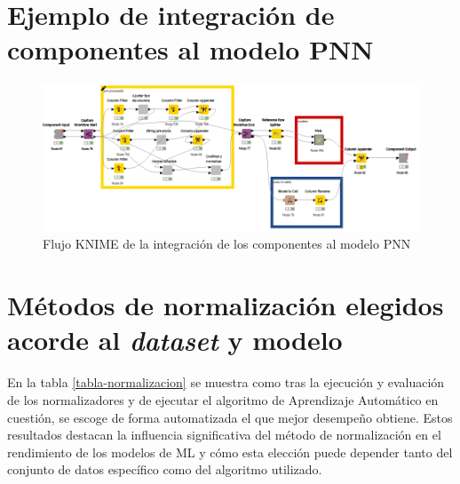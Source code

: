 \chapter{Ejemplo de integración de componentes al modelo PNN} \label{aped:14}

\begin{figure}[H]
	\centering
	\includegraphics[width=\textwidth]{"figuras/anexos/ejemplo integracion componentes pnn"}
	\caption{Flujo KNIME de la integración de los componentes al modelo PNN}
	\label{fig:ejemplo-integracion-componentes-pnn}
\end{figure}


\chapter{Métodos de normalización elegidos acorde al \textit{dataset} y modelo} \label{aped:15-normalizacion}
En la tabla \ref{tabla-normalizacion} se muestra como tras la ejecución y evaluación de los normalizadores y de ejecutar el algoritmo de Aprendizaje Automático en cuestión, se escoge de forma automatizada el que mejor desempeño obtiene. Estos resultados destacan la influencia significativa del método de normalización en el rendimiento de los modelos de ML y cómo esta elección puede depender tanto del conjunto de datos específico como del algoritmo utilizado. 

